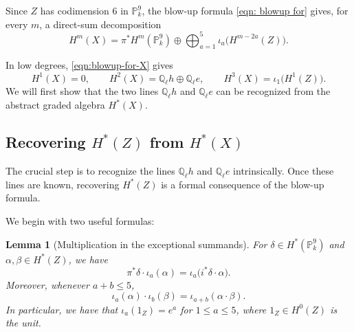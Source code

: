 \documentclass[11pt, reqno]{amsart}
\newtheorem{lemma}[theorem]{Lemma}
\theoremstyle{definition}
\newcommand\QQ{\mathbb{Q}}
\newcommand\PP{\mathbb{P}}
\begin{document}
Since $Z$ has codimension $6$ in $\PP^9_k$, the blow-up formula
\eqref{eqn: blowup for} gives, for every $m$, a direct-sum decomposition
\begin{equation}
\label{eqn:blowup-for-X}
H^m(X)
=
\pi^*H^m(\PP^9_k)
\oplus
\bigoplus_{a=1}^{5}
\iota_a\bigl(H^{m-2a}(Z)\bigr).
\end{equation}


In low degrees, \eqref{eqn:blowup-for-X} gives
\[
H^1(X)=0,\qquad
H^2(X)=\QQ_\ell h\oplus\QQ_\ell e,\qquad
H^3(X)=\iota_1\bigl(H^1(Z)\bigr).
\]
We will first
show that the two lines $\QQ_\ell h$ and $\QQ_\ell e$ can be recognized
from the abstract graded algebra $H^*(X)$.

\subsection{Recovering $H^*(Z)$ from $H^*(X)$}
\label{subsubsec:recovering-Z-from-X}\;

The crucial step is to recognize the lines $\QQ_\ell h$ and
$\QQ_\ell e$ intrinsically.  Once these lines are known, recovering
$H^*(Z)$ is a formal consequence of the blow-up formula.

We begin with two useful formulas:

\begin{lemma}[Multiplication in the exceptional summands]
\label{lem:multiplication-exceptional-summands}
For $\delta\in H^*(\PP^9_k)$ and $\alpha,\beta\in H^*(Z)$, we have
\begin{equation}
\label{eqn:ambient-exceptional-product}
\pi^*\delta\cdot\iota_a(\alpha)
=
\iota_a\bigl(i^*\delta\cdot\alpha\bigr).
\end{equation}
Moreover, whenever $a+b\leq 5$,
\begin{equation}
\label{eqn:exceptional-product}
\iota_a(\alpha)\cdot\iota_b(\beta)
=
\iota_{a+b}(\alpha\cdot\beta).
\end{equation}
In particular, we have that $\iota_a(1_Z)=e^a$ for $1\leq a\leq 5$, where $1_Z\in H^0(Z)$ is the unit.
\end{lemma}
\end{document}
